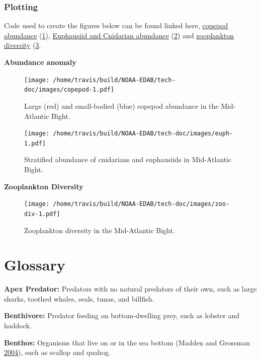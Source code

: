 \documentclass[
]{book}
\begin{document}
\hypertarget{plotting-37}{%
\subsection{Plotting}\label{plotting-37}}

Code used to create the figures below can be found linked here, \href{https://github.com/NOAA-EDAB/ecodata/blob/master/chunk-scripts/LTL.Rmd-MAB-zoo-abund.R}{copepod abundance} (\ref{fig:copepod}), \href{https://github.com/NOAA-EDAB/ecodata/blob/master/chunk-scripts/LTL.Rmd-MAB-euph-cnid.R}{Euphausiid and Cnidarian abundance} (\ref{fig:euph}) and \href{https://github.com/NOAA-EDAB/ecodata/blob/master/chunk-scripts//LTL.Rmd-MAB-zoo-abund1.R}{zooplankton diversity} (\ref{fig:zoo-div}.

\textbf{Abundance anomaly}

\begin{figure}
\centering
\texttt{[image: /home/travis/build/NOAA-EDAB/tech-doc/images/copepod-1.pdf]}
\caption{\label{fig:copepod}Large (red) and small-bodied (blue) copepod abundance in the Mid-Atlantic Bight.}
\end{figure}

\begin{figure}
\centering
\texttt{[image: /home/travis/build/NOAA-EDAB/tech-doc/images/euph-1.pdf]}
\caption{\label{fig:euph}Stratified abundance of cnidarians and euphausiids in Mid-Atlantic Bight.}
\end{figure}

\textbf{Zooplankton Diversity}

\begin{figure}
\centering
\texttt{[image: /home/travis/build/NOAA-EDAB/tech-doc/images/zoo-div-1.pdf]}
\caption{\label{fig:zoo-div}Zooplankton diversity in the Mid-Atlantic Bight.}
\end{figure}

\hypertarget{glossary}{%
\chapter{Glossary}\label{glossary}}

\textbf{Apex Predator:}
Predators with no natural predators of their own, such as large sharks, toothed whales, seals, tunas, and billfish.

\textbf{Benthivore:}
Predator feeding on bottom-dwelling prey, such as lobster and haddock.

\textbf{Benthos:}
Organisms that live on or in the sea bottom (Madden and Grossman \protect\hyperlink{ref-madden2004}{2004}), such as scallop and quahog.
\end{document}

